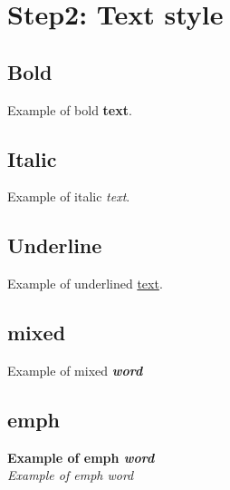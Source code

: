 \documentclass[../main.tex]{subfiles}
\begin{document}
\chapter{Step2: Text style}
\label{chap:tutorial2}

\section{Bold}
Example of bold \textbf{text}.
\section{Italic}
Example of italic \textit{text}.
\section{Underline}
Example of underlined \underline{text}.
\section{mixed}
Example of mixed \textbf{\textit{word}}
\section{emph}
\textbf{Example of emph \emph{word}}\\
\textit{Example of emph \emph{word}}
\end{document}

